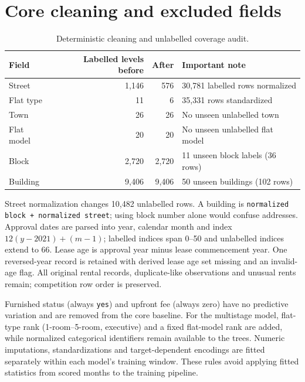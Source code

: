 \documentclass[10pt,a4paper]{article}
\begin{document}
\section{Core cleaning and excluded fields}\label{app:core}
\begin{table}[htbp]\centering\small
\caption{Deterministic cleaning and unlabelled coverage audit.}\label{tab:clean-compact}
\begin{tabular}{lrrl}\toprule
Field & Labelled levels before & After & Important note \\\midrule
Street & 1,146 & 576 & 30,781 labelled rows normalized\\
Flat type & 11 & 6 & 35,331 rows standardized\\
Town & 26 & 26 & No unseen unlabelled town\\
Flat model & 20 & 20 & No unseen unlabelled flat model\\
Block & 2,720 & 2,720 & 11 unseen block labels (36 rows)\\
Building & 9,406 & 9,406 & 50 unseen buildings (102 rows)\\\bottomrule
\end{tabular}\end{table}
Street normalization changes 10,482 unlabelled rows. A building is \texttt{normalized block + normalized street}; using block number alone would confuse addresses. Approval dates are parsed into year, calendar month and index $12(y-2021)+(m-1)$; labelled indices span 0--50 and unlabelled indices extend to 66. Lease age is approval year minus lease commencement year. One reversed-year record is retained with derived lease age set missing and an invalid-age flag. All original rental records, duplicate-like observations and unusual rents remain; competition row order is preserved.

Furnished status (always \texttt{yes}) and upfront fee (always zero) have no predictive variation and are removed from the core baseline. For the multistage model, flat-type rank (1-room--5-room, executive) and a fixed flat-model rank are added, while normalized categorical identifiers remain available to the trees. Numeric imputations, standardizations and target-dependent encodings are fitted separately within each model's training window. These rules avoid applying fitted statistics from scored months to the training pipeline.
\end{document}
